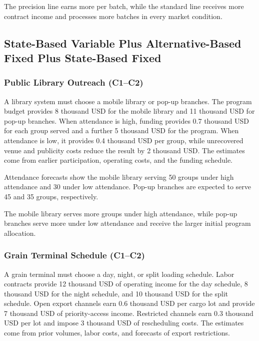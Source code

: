 	The precision line earns more per batch, while the standard line receives more contract income and processes more batches in every market condition.

	
	\subsection{State-Based Variable Plus Alternative-Based Fixed Plus State-Based Fixed}
	\label{sec:state-based-variable-payoff-plus-alternative-based-fixed-payoff-plus-state-based-fixed-payoff}



	\subsubsection{Public Library Outreach (C1--C2)}
	\label{sec:problem32-public-library-outreach-c1-c2}
	
	A library system must choose a mobile library or pop-up branches. The program budget provides 8 thousand USD for the mobile library and 11 thousand USD for pop-up branches. When attendance is high, funding provides 0.7 thousand USD for each group served and a further 5 thousand USD for the program. When attendance is low, it provides 0.4 thousand USD per group, while unrecovered venue and publicity costs reduce the result by 2 thousand USD. The estimates come from earlier participation, operating costs, and the funding schedule.
	
	Attendance forecasts show the mobile library serving 50 groups under high attendance and 30 under low attendance. Pop-up branches are expected to serve 45 and 35 groups, respectively.
	
	The mobile library serves more groups under high attendance, while pop-up branches serve more under low attendance and receive the larger initial program allocation.
	
	\subsubsection{Grain Terminal Schedule (C1--C2)}
	\label{sec:problem33-grain-terminal-schedule-c1-c2}
	
	A grain terminal must choose a day, night, or split loading schedule. Labor contracts provide 12 thousand USD of operating income for the day schedule, 8 thousand USD for the night schedule, and 10 thousand USD for the split schedule. Open export channels earn 0.6 thousand USD per cargo lot and provide 7 thousand USD of priority-access income. Restricted channels earn 0.3 thousand USD per lot and impose 3 thousand USD of rescheduling costs. The estimates come from prior volumes, labor costs, and forecasts of export restrictions.
	
